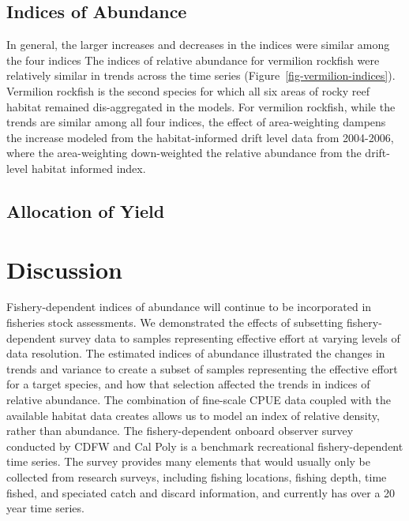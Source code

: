 \documentclass[
  12pt,
  authoryear,
  preprint,
  3p]{elsarticle}
\begin{document}
\hypertarget{indices-of-abundance-1}{%
\subsection{Indices of Abundance}\label{indices-of-abundance-1}}

In general, the larger increases and decreases in the indices were
similar among the four indices The indices of relative abundance for
vermilion rockfish were relatively similar in trends across the time
series (Figure~\ref{fig-vermilion-indices}). Vermilion rockfish is the
second species for which all six areas of rocky reef habitat remained
dis-aggregated in the models. For vermilion rockfish, while the trends
are similar among all four indices, the effect of area-weighting dampens
the increase modeled from the habitat-informed drift level data from
2004-2006, where the area-weighting down-weighted the relative abundance
from the drift-level habitat informed index.

\hypertarget{allocation-of-yield}{%
\subsection{Allocation of Yield}\label{allocation-of-yield}}

\FloatBarrier

\hypertarget{discussion}{%
\section{Discussion}\label{discussion}}

Fishery-dependent indices of abundance will continue to be incorporated
in fisheries stock assessments. We demonstrated the effects of
subsetting fishery-dependent survey data to samples representing
effective effort at varying levels of data resolution. The estimated
indices of abundance illustrated the changes in trends and variance to
create a subset of samples representing the effective effort for a
target species, and how that selection affected the trends in indices of
relative abundance. The combination of fine-scale CPUE data coupled with
the available habitat data creates allows us to model an index of
relative density, rather than abundance. The fishery-dependent onboard
observer survey conducted by CDFW and Cal Poly is a benchmark
recreational fishery-dependent time series. The survey provides many
elements that would usually only be collected from research surveys,
including fishing locations, fishing depth, time fished, and speciated
catch and discard information, and currently has over a 20 year time
series.
\end{document}
